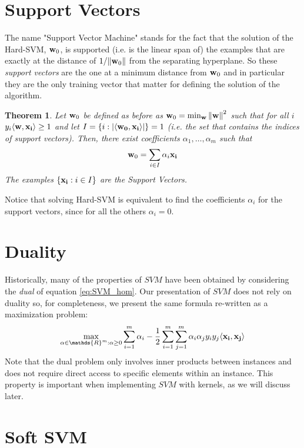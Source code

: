 \documentclass[12pt]{report}
\theoremstyle{plain}
\newtheorem{theorem}{Theorem}[chapter]
\newcommand\sprod[2]{\langle \vb{#1},\vb{#2}\rangle}
\begin{document}
\begin{flushleft}
\section{Support Vectors}
The name "Support Vector Machine" stands for the fact that the solution of the Hard-SVM, $\vb{w}_0$, is supported (i.e. is the linear span of) the examples that are exactly at the distance of $1/\norm{\vb{w}_0}$ from the separating hyperplane. So these \textit{support vectors} are the one at a minimum distance from $\vb{w}_0$ and in particular they are the only training vector that matter for defining the solution of the algorithm.\\
\begin{theorem}
	Let $\vb{w}_0$ be defined as before as $\vb{w}_0=\min_{\vb{w}}\norm{\vb{w}}^2$ such that for all $i$ $y_i\sprod{w}{x_i}\geq 1$ and let $I=\left\{i:\abs{\sprod{w_0}{x_i}}\right\}=1$ (i.e. the set that contains the indices of support vectors). Then, there exist coefficients $\alpha_1,\dots,\alpha_m$ such that
	\[ \vb{w}_0=\sum_{i\in I}\alpha_i\vb{x_i} \]
	The examples $\left\{\vb{x_i}:i\in I\right\}$ are the Support Vectors.
\end{theorem}
Notice that solving Hard-SVM is equivalent to find the coefficients $\alpha_i$ for the support vectors, since for all the others $\alpha_i=0$.

\section{Duality}
Historically, many of the properties of $SVM$ have been obtained by considering the \textit{dual} of equation \ref{eq:SVM_hom}. Our presentation of $SVM$ does not rely on duality so, for completeness, we present the same formula re-written as a maximization problem:
\[ \max_{\vb{\alpha}\in\mathds{R}^m:\vb{\alpha}\geq 0}\sum_{i=1}^m\alpha_i-\frac{1}{2}\sum_{i=1}^m\sum_{j=1}^m\alpha_i\alpha_jy_iy_j\sprod{x_i}{x_j} \]
Note that the dual problem only involves inner products between instances and does not require direct access to specific elements within an instance. This property is important when implementing $SVM$ with kernels, as we will discuss later.

\section{Soft SVM}
















\end{flushleft}
\end{document}
